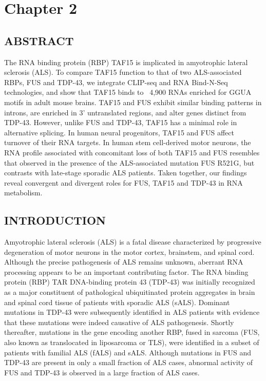 \chapter{Chapter 2}

\section{ABSTRACT}

The RNA binding protein (RBP) TAF15 is implicated in amyotrophic lateral sclerosis (ALS). To compare TAF15 function to that of two ALS-associated RBPs, FUS and TDP-43, we integrate CLIP-seq and RNA Bind-N-Seq technologies, and show that TAF15 binds to ~4,900 RNAs enriched for GGUA motifs in adult mouse brains. TAF15 and FUS exhibit similar binding patterns in introns, are enriched in 3’ untranslated regions, and alter genes distinct from TDP-43. However, unlike FUS and TDP-43, TAF15 has a minimal role in alternative splicing. In human neural progenitors, TAF15 and FUS affect turnover of their RNA targets. In human stem cell-derived motor neurons, the RNA profile associated with concomitant loss of both TAF15 and FUS resembles that observed in the presence of the ALS-associated mutation FUS R521G, but contrasts with late-stage sporadic ALS patients. Taken together, our findings reveal convergent and divergent roles for FUS, TAF15 and TDP-43 in RNA metabolism.
 
\section{INTRODUCTION}
Amyotrophic lateral sclerosis (ALS) is a fatal disease characterized by progressive degeneration of motor neurons in the motor cortex, brainstem, and spinal cord. Although the precise pathogenesis of ALS remains unknown, aberrant RNA processing appears to be an important contributing factor. The RNA binding protein (RBP) TAR DNA-binding protein 43 (TDP-43) was initially recognized as a major constituent of pathological ubiquitinated protein aggregates in brain and spinal cord tissue of patients with sporadic ALS (sALS)\cite{Arai2006,Neumann2006a}. Dominant mutations in TDP-43 were subsequently identified in ALS patients\cite{Corrado2009,Daoud2009,DelBo2009,Kuhnlein2008,Lemmens2009,Rutherford2008} with evidence that these mutations were indeed causative of ALS pathogenesis\cite{Sreedharan2008}. Shortly thereafter, mutations in the gene encoding another RBP, fused in sarcoma (FUS, also known as translocated in liposarcoma or TLS), were identified in a subset of patients with familial ALS (fALS) and sALS\cite{Vance2009,Kwiatkowski2009}. Although mutations in FUS and TDP-43 are present in only a small fraction of ALS cases, abnormal activity of FUS and TDP-43 is observed in a large fraction of ALS cases.



